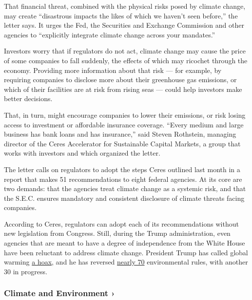 That financial threat, combined with the physical risks posed by climate
change, may create ``disastrous impacts the likes of which we haven't
seen before,'' the letter says. It urges the Fed, the Securities and
Exchange Commission and other agencies to ``explicitly integrate climate
change across your mandates.''

Investors worry that if regulators do not act, climate change may cause
the price of some companies to fall suddenly, the effects of which may
ricochet through the economy. Providing more information about that risk
--- for example, by requiring companies to disclose more about their
greenhouse gas emissions, or which of their facilities are at risk from
rising seas --- could help investors make better decisions.

That, in turn, might encourage companies to lower their emissions, or
risk losing access to investment or affordable insurance coverage.
``Every medium and large business has bank loans and has insurance,''
said Steven Rothstein, managing director of the Ceres Accelerator for
Sustainable Capital Markets, a group that works with investors and which
organized the letter.

The letter calls on regulators to adopt the steps Ceres outlined last
month in a report that makes 51 recommendations to eight federal
agencies. At its core are two demands: that the agencies treat climate
change as a systemic risk, and that the S.E.C. ensures mandatory and
consistent disclosure of climate threats facing companies.

According to Ceres, regulators can adopt each of its recommendations
without new legislation from Congress. Still, during the Trump
administration, even agencies that are meant to have a degree of
independence from the White House have been reluctant to address climate
change. President Trump has called global warming
\href{https://twitter.com/realDonaldTrump/status/265895292191248385?ref_src=twsrc\%5Etfw}{a
hoax}, and he has reversed
\href{https://www.nytimes3xbfgragh.onion/interactive/2020/climate/trump-environment-rollbacks.html}{nearly
70} environmental rules, with another 30 in progress.

\href{https://www.nytimes3xbfgragh.onion/section/climate?action=click\&pgtype=Article\&state=default\&region=MAIN_CONTENT_1\&context=storylines_keepup}{}

\hypertarget{climate-and-environment-}{%
\subsubsection{Climate and Environment
›}\label{climate-and-environment-}}

